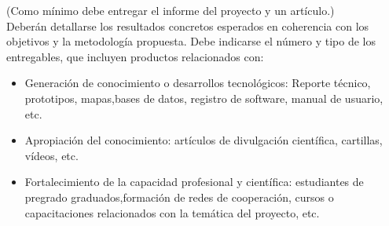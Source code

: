 \documentclass[../Main.tex]{subfiles}
\begin{document}
(Como mínimo debe entregar el informe del proyecto y un
artículo.)\\
Deberán detallarse los resultados concretos esperados en coherencia con los objetivos y la
metodología propuesta. Debe indicarse el número y tipo de los entregables, que incluyen productos
relacionados con:
\begin{itemize}
   \item Generación de conocimiento o desarrollos tecnológicos:      Reporte técnico, prototipos, mapas,bases de datos, registro de   software, manual de usuario, etc.
    \item Apropiación del conocimiento: artículos de divulgación científica, cartillas, vídeos, etc.
    \item Fortalecimiento de la capacidad profesional y científica: estudiantes de pregrado graduados,formación de redes de cooperación, cursos o capacitaciones relacionados con la temática del proyecto, etc.
\end{itemize}
\end{document}
